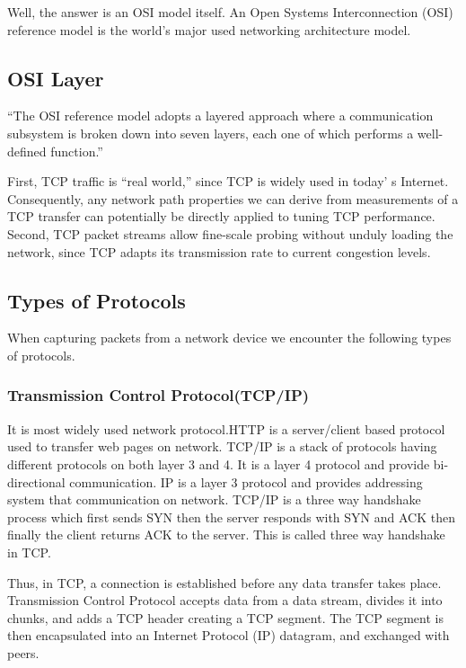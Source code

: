 \documentclass[12pt]{article}
\theoremstyle{definition}
\begin{document}
	Well,   the   answer   is   an   OSI   model   itself.   An   Open Systems  Interconnection  (OSI)  reference  model  is  the world’s major used networking architecture model.
	
		\subsection{OSI Layer}
		``The  OSI  reference  model  adopts  a  layered  approach 
		where  a  communication subsystem  is  broken  down  into seven  layers,  each  one  of  which  performs  a well-defined function.''
		
		 First, TCP traffic is “real world,” since TCP is widely used in today' s Internet.  Consequently, any network path properties we can derive from measurements of a TCP transfer can potentially be directly applied to tuning TCP performance.  Second, TCP packet streams  allow  fine-scale  probing  without  unduly  loading  the  network, since TCP adapts its transmission rate to current congestion levels.
	 
		\subsection{Types of Protocols}
			When capturing packets from a network device we encounter the following types of protocols.
			
			\subsubsection{Transmission Control Protocol(TCP/IP)}
			It  is  most  widely  used network  protocol.HTTP  is  a  server/client  based  protocol used to transfer web pages on network.
			TCP/IP is a stack of protocols having different protocols on both layer 3 and 4. It   is   a   layer 4 protocol and provide bi-directional communication. IP is a layer 3 protocol  and  provides addressing system that communication on  network. TCP/IP is a three way handshake process which first sends SYN then the server responds with SYN and ACK then finally the client returns ACK to the server. This is called three way handshake in TCP.
			
			Thus, in TCP, a connection is established before any data transfer takes place. Transmission Control Protocol accepts data from a data stream, divides it into chunks, and adds a TCP header creating a TCP segment. The TCP segment is then encapsulated into an Internet Protocol (IP) datagram, and exchanged with peers.
			
\end{document}
